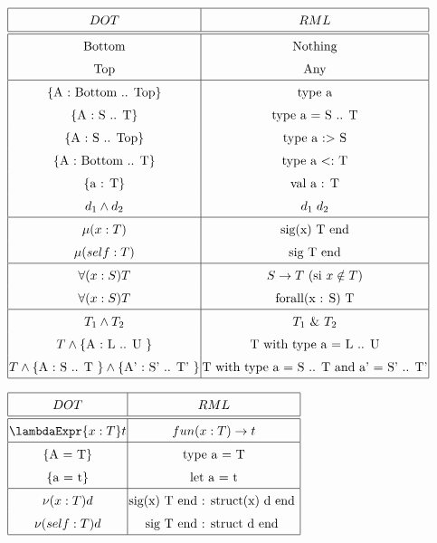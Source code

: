 \begin{center}
$\arraycolsep=1.0pt\def\arraystretch{1.5}
\begin{array}{|c|c|}
  \hline
  DOT & RML \\
  \hline \hline
  \text{Bottom} & \text{Nothing} \\
  \text{Top} & \text{Any} \\
  \hline
  \left\{ \text{A : Bottom .. Top} \right\} & \text{type a} \\
  \left\{ \text{A : S .. T} \right\} & \text{type a = S  .. T} \\
  \left\{ \text{A : S .. Top} \right\} & \text{type a $:>$ S} \\
  \left\{ \text{A : Bottom .. T} \right\} & \text{type a $<:$ T} \\
  \left\{ \text{a : T} \right\} & \text{val a : T} \\
  d_{1} \wedge d_{2} & d_{1} \; d_{2} \\
  \hline
  \mu(x : T) & \text{sig(x) T end} \\
  \mu(self : T) & \text{sig T end} \\
  \hline
  \forall(x : S) T & S \rightarrow T \text{ (si $x \notin T$)}\\
  \forall(x : S) T & \text{forall(x : S) T} \\
  \hline
  T_{1} \wedge T_{2} & T_{1} \text{ \& } T_{2} \\
  T \wedge \left\{ \text{A : L .. U } \right\} & \text{T with type a = L .. U} \\
  T \wedge \left\{ \text{A : S .. T } \right\} \wedge \left\{ \text{A' : S' ..
  T' } \right\} & \text{T with type a = S .. T and a' = S' .. T'} \\
  \hline
\end{array}
$
\end{center}

\begin{center}
$\arraycolsep=1.0pt\def\arraystretch{1.5}
\begin{array}{|c|c|}
  \hline
  DOT & RML \\
  \hline \hline
  \lambdaExpr{x : T} t & fun(x : T) \rightarrow t \\
  \hline
  \left\{ \text{A = T} \right\} & \text{type a = T} \\
  \left\{ \text{a = t} \right\} & \text{let a = t} \\
  \hline
  \nu(x : T) d & \text{sig(x) T end : struct(x) d end } \\
  \nu(self : T) d & \text{sig T end : struct d end } \\
  \hline
\end{array}
$
\end{center}

